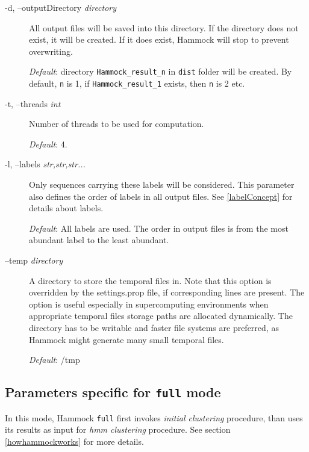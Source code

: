 \documentclass[11pt, a4paper, twoside, titlepage]{article}
\begin{document}
\begin{description}
	\item[-d, --outputDirectory \rm \textlangle \textit{directory}\textrangle] All output files will be saved into this directory. If the directory does not exist, it will be created. If it does exist, Hammock will stop to prevent overwriting. 
	 
	  \textit{Default}: directory \texttt{Hammock\_result\_n} in \texttt{dist} folder will be created. By default, \texttt{n} is 1, if \texttt{Hammock\_result\_1} exists, then \texttt{n} is 2 etc. 

\item[-t, --threads \rm \textlangle \textit{int}\textrangle] Number of threads to be used for computation.

 \textit{Default}: 4. 

\item[-l, --labels \rm \textlangle \textit{str,str,str...}\textrangle] Only sequences carrying these labels will be considered. This parameter also defines the order of labels in all output files. See \ref{labelConcept} for details about labels. 

\textit{Default}: All labels are used. The order in output files is from the most abundant label to the least abundant. 

\item[--temp \rm \textlangle \textit{directory}\textrangle] A directory to store the temporal files in. Note that this option is overridden by the settings.prop file, if corresponding lines are present. The option is useful especially in supercomputing environments when appropriate temporal files storage paths are allocated dynamically. The directory has to be writable and faster file systems are preferred, as Hammock might generate many small temporal files.

\textit{Default}: /tmp

	
\end{description}

\subsection{Parameters specific for \texttt{full} mode}
\label{parametersFull}
In this mode, Hammock \texttt{full} first invokes \textit{initial clustering} procedure, than uses its results as input for \textit{hmm clustering} procedure. See section \ref{howhammockworks} for more details.
\end{document}
